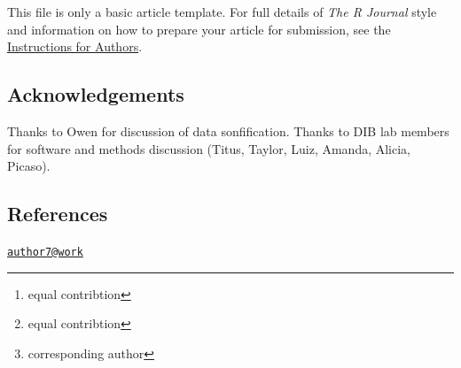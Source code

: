 This file is only a basic article template. For full details of
\emph{The R Journal} style and information on how to prepare your
article for submission, see the
\href{https://journal.r-project.org/share/author-guide.pdf}{Instructions
for Authors}.

\hypertarget{acknowledgements}{%
\subsection{Acknowledgements}\label{acknowledgements}}

Thanks to Owen for discussion of data sonfification. Thanks to DIB lab
members for software and methods discussion (Titus, Taylor, Luiz,
Amanda, Alicia, Picaso).

\hypertarget{references}{%
\subsection{References}\label{references}}




\address{%
Rayna M Harris \footnote{equal contribtion}\\
UC Davis\\
\\
}


\address{%
Suzanne H. Austin \footnote{equal contribtion}\\
UC Davis\\
\\
}


\address{%
Andrew S. Lang\\
UNH\\
\\
}


\address{%
Victoria S. Farrar\\
UC Davis\\
\\
}


\address{%
April Booth\\
UC Davis\\
\\
}


\address{%
Tanner Feustel\\
UC Davis\\
\\
}


\address{%
Matthew D. MacManes\\
UNH\\
\\
}


\address{%
Rebecca M. Calisi \footnote{corresponding author}\\
UC Davis\\
\\
}
\href{mailto:author7@work}{\nolinkurl{author7@work}}

